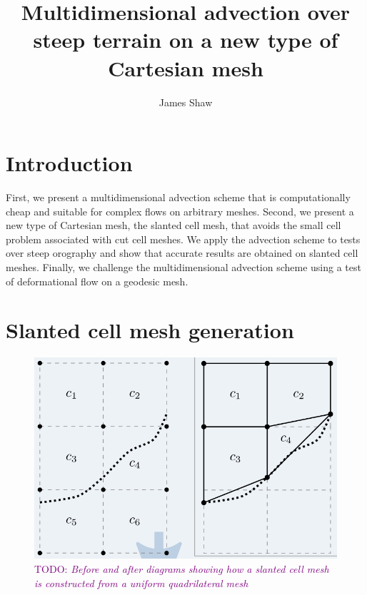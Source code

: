 \documentclass{article}
\title{Multidimensional advection over steep terrain on a new type of Cartesian mesh \\ \TODO{(working title)}}
\author{James Shaw}
\newcommand{\TODO}[1]{\textcolor{purple}{TODO: \emph{#1}}}
\begin{document}
\maketitle

\section{Introduction}

First, we present a multidimensional advection scheme that is computationally cheap and suitable for complex flows on arbitrary meshes.  Second, we present a new type of Cartesian mesh, the slanted cell mesh, that avoids the small cell problem associated with cut cell meshes.   We apply the advection scheme to tests over steep orography and show that accurate results are obtained on slanted cell meshes.  Finally, we challenge the multidimensional advection scheme using a test of deformational flow on a geodesic mesh.

\section{Slanted cell mesh generation}

\begin{figure}
	\includegraphics[width=\textwidth]{slantCellConstruction.png}
	\caption{\TODO{Before and after diagrams showing how a slanted cell mesh is constructed from a uniform quadrilateral mesh}}
\end{figure}
\end{document}
